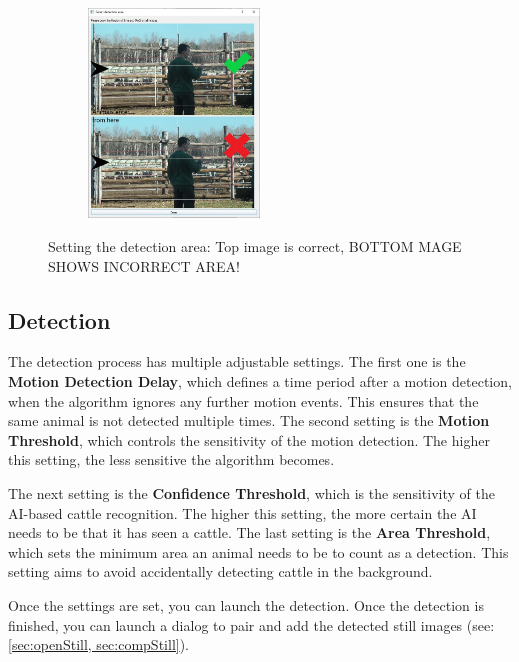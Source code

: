 \documentclass[10pt,a4paper,oneside]{report}             %
\begin{document}
\begin{figure}[H]
	\centering
	\begin{subfigure}{\textwidth}
		\centering 
		\includegraphics[width=0.5\textwidth]{./images/DetArea.jpg}
	\end{subfigure}
	\caption[]
	{\small  Setting the detection area: Top image is correct, BOTTOM MAGE SHOWS INCORRECT AREA!}
\end{figure} 

\subsection{Detection}

The detection process has multiple adjustable settings. The first one is the \textbf{Motion Detection Delay}, which defines a time period after a motion detection, when the algorithm ignores any further motion events. This ensures that the same animal is not detected multiple times. The second setting is the \textbf{Motion Threshold}, which controls the sensitivity of  the motion detection. The higher this setting, the less sensitive the algorithm becomes. 

The next setting is the \textbf{Confidence Threshold}, which is the sensitivity of the AI-based cattle recognition. The higher this setting, the more certain the AI needs to be that it has seen a cattle. The last setting is the \textbf{Area Threshold}, which sets the minimum area an animal needs to be to count as a detection. This setting aims to avoid accidentally detecting cattle in the background.

Once the settings are set, you can launch the detection. Once the detection is finished, you can launch a dialog to pair and add the detected still images (see: \autoref{sec:openStill, sec:compStill}).
\end{document}
